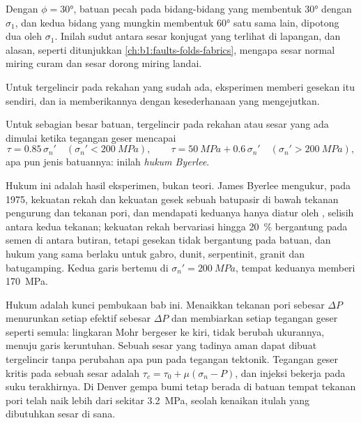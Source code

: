 Dengan $\phi = \ang{30}$, batuan pecah pada bidang-bidang yang membentuk \ang{30} dengan $\sigma_1$, dan kedua bidang yang mungkin membentuk \ang{60} satu sama lain, dipotong dua oleh $\sigma_1$. Inilah sudut antara sesar konjugat yang terlihat di lapangan, dan alasan, seperti ditunjukkan \cref{ch:b1:faults-folds-fabrics}, mengapa sesar normal miring curam dan sesar dorong miring landai.

Untuk tergelincir pada rekahan yang sudah ada, eksperimen memberi gesekan itu sendiri, dan ia memberikannya dengan kesederhanaan yang mengejutkan.

\begin{proposition}\label{prop:b1:stress-strain-rheology:byerlee}
Untuk sebagian besar batuan, tergelincir pada rekahan atau sesar yang ada dimulai ketika tegangan geser mencapai
\[
  \tau = 0.85\,\sigma_n' \quad (\sigma_n' < \qty{200}{MPa}), \qquad
  \tau = \qty{50}{MPa} + 0.6\,\sigma_n' \quad (\sigma_n' > \qty{200}{MPa}),
\]
apa pun jenis batuannya: inilah \emph{hukum Byerlee}.
\end{proposition}
\admitted

Hukum ini adalah hasil eksperimen, bukan teori. James Byerlee mengukur, pada 1975, kekuatan rekah dan kekuatan gesek sebuah batupasir di bawah tekanan pengurung dan tekanan pori, dan mendapati keduanya hanya diatur oleh , selisih antara kedua tekanan; kekuatan rekah bervariasi hingga \qty{20}{\percent} bergantung pada semen di antara butiran, tetapi gesekan tidak bergantung pada batuan, dan hukum yang sama berlaku untuk gabro, dunit, serpentinit, granit dan batugamping. Kedua garis bertemu di $\sigma_n' = \qty{200}{MPa}$, tempat keduanya memberi \qty{170}{MPa}.

Hukum  adalah kunci pembukaan bab ini. Menaikkan tekanan pori sebesar $\Delta P$ menurunkan setiap  efektif sebesar $\Delta P$ dan membiarkan setiap tegangan geser seperti semula: lingkaran Mohr bergeser ke kiri, tidak berubah ukurannya, menuju garis keruntuhan. Sebuah sesar yang tadinya aman dapat dibuat tergelincir tanpa perubahan apa pun pada tegangan tektonik. Tegangan geser kritis pada sebuah sesar adalah $\tau_c = \tau_0 + \mu(\sigma_n - P)$, dan injeksi bekerja pada suku terakhirnya. Di Denver gempa bumi tetap berada di batuan tempat tekanan pori telah naik lebih dari sekitar \qty{3.2}{MPa}, seolah kenaikan itulah yang dibutuhkan sesar di sana.

